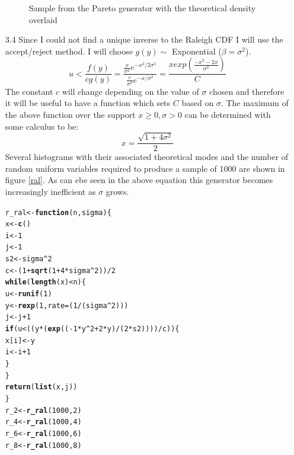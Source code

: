 \documentclass{article}\usepackage[]{graphicx}\usepackage[]{color}
\makeatletter
\newcommand{\hlkwd}[1]{\textcolor[rgb]{0.737,0.353,0.396}{\textbf{#1}}}%
\newenvironment{kframe}{%
 \def\at@end@of@kframe{}%
 \ifinner\ifhmode%
  \def\at@end@of@kframe{\end{minipage}}%
  \begin{minipage}{\columnwidth}%
 \fi\fi%
 \def\FrameCommand##1{\hskip\@totalleftmargin \hskip-\fboxsep
 \colorbox{shadecolor}{##1}\hskip-\fboxsep
     \hskip-\linewidth \hskip-\@totalleftmargin \hskip\columnwidth}%
 \MakeFramed {\advance\hsize-\width
   \@totalleftmargin\z@ \linewidth\hsize
   \@setminipage}}%
 {\par\unskip\endMakeFramed%
 \at@end@of@kframe}
\newenvironment{knitrout}{}{} %
\makeatother
\begin{document}
\begin{itemize}
\begin{figure}
\begin{knitrout}
\end{knitrout}

\caption{Sample from the Pareto generator with the theoretical density overlaid}
\label{pareto}
\end{figure}
\clearpage

\item[3.4] Since I could not find a unique inverse to the Raleigh CDF I will use the accept/reject method.  I will choose $g(y) \sim$ Exponential ($\beta=\sigma^2$).  
$$u< \frac{f(y)}{cg(y)}=\frac{\frac{x}{\sigma^2}e^{-x^2/2\sigma^2}}{\frac{c}{\sigma^2}e^{-x/\sigma^2}}=\frac{xexp(\frac{-x^2-2x}{\sigma^2})}{C}$$
The constant $c$ will change depending on the value of $\sigma$ chosen and therefore it will be useful to have a function which sets $C$ based on $\sigma$.  The maximum of the above function over the support $x\geq0,\sigma>0$ can be determined with some calculus to be:\\
$$x=\frac{\sqrt{1+4\sigma^2}}{2}$$
Several histograms with their associated theoretical modes and the number of random uniform variables required to produce a sample of 1000 are shown in figure \ref{ral}.  As can ebe seen in the above equation this generator becomes increasingly inefficient as $\sigma$ grows.\\  
\begin{knitrout}
\color{fgcolor}\begin{kframe}
\begin{alltt}
r_ral <- \hlkwd{function}(n, sigma) \{
    x <- \hlkwd{c}()
    i <- 1
    j <- 1
    s2 <- sigma^2
    c <- (1 + \hlkwd{sqrt}(1 + 4 * sigma^2))/2
    \hlkwd{while} (\hlkwd{length}(x) < n) \{
        u <- \hlkwd{runif}(1)
        y <- \hlkwd{rexp}(1, rate = (1/(sigma^2)))
        j <- j + 1
        \hlkwd{if} (u < ((y * (\hlkwd{exp}((-1 * y^2 + 2 * y)/(2 * s2))))/c)) \{
            x[i] <- y
            i <- i + 1
        \}
    \}
    \hlkwd{return}(\hlkwd{list}(x, j))
\}
r_2 <- \hlkwd{r_ral}(1000, 2)
r_4 <- \hlkwd{r_ral}(1000, 4)
r_6 <- \hlkwd{r_ral}(1000, 6)
r_8 <- \hlkwd{r_ral}(1000, 8)
\end{alltt}
\end{kframe}
\end{knitrout}


\end{itemize}
\end{document}
